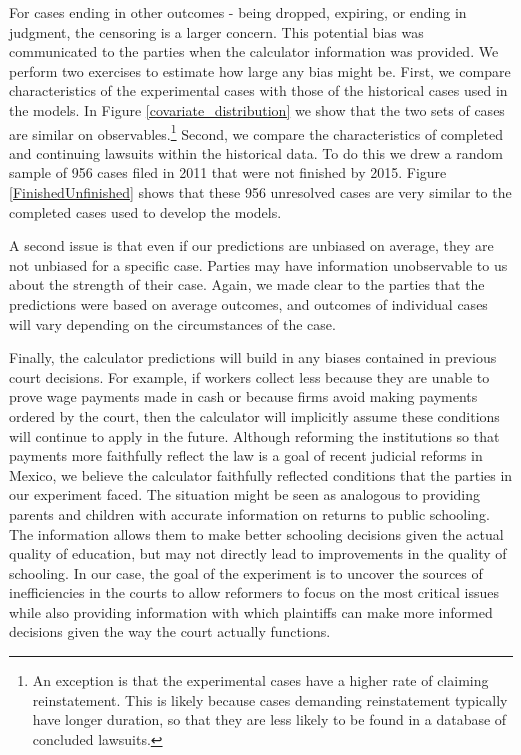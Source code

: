 \documentclass[11pt, a4paper]{article}
\begin{document}
For cases ending in other outcomes - being dropped, expiring, or ending in judgment, the censoring is a larger concern. This potential bias was communicated to the parties when the calculator information was provided. We perform two exercises to estimate how large any bias might be. First, we compare characteristics of the experimental cases with those of the historical cases used in the models. In Figure \ref{covariate_distribution} we show that the two sets of cases are similar on observables.\footnote{An exception is that the experimental cases have a higher rate of claiming reinstatement. This is likely because cases demanding reinstatement typically have longer duration, so that they are less likely to be found in a database of concluded lawsuits.} Second, we compare the characteristics of completed and continuing lawsuits within the historical data. To do this we drew a random sample of 956 cases filed in 2011 that were not finished by 2015. Figure \ref{FinishedUnfinished} shows that these 956 unresolved cases are very similar to the completed cases used to develop the models.%

A second issue is that even if our predictions are unbiased on average, they are not unbiased for a specific case. Parties may have information unobservable to us about the strength of their case. Again, we made clear to the parties that the predictions were based on average outcomes, and outcomes of individual cases will vary depending on the circumstances of the case. 

Finally, the calculator predictions will build in any biases contained in previous court decisions. For example, if workers collect less because they are unable to prove wage payments made in cash or because firms avoid making payments ordered by the court, then the calculator will implicitly assume these conditions will continue to apply in the future. Although reforming the institutions so that payments more faithfully reflect the law is a goal of recent judicial reforms in Mexico, we believe the calculator faithfully reflected conditions that the parties in our experiment faced. The situation might be seen as analogous to providing parents and children with accurate information on returns to public schooling. The information allows them to make better schooling decisions given the actual quality of education, but may not directly lead to improvements in the quality of schooling. In our case, the goal of the experiment is to uncover the sources of inefficiencies in the courts to allow reformers to focus on the most critical issues while also providing information with which plaintiffs can make more informed decisions given the way the court actually functions. %
\end{document}
